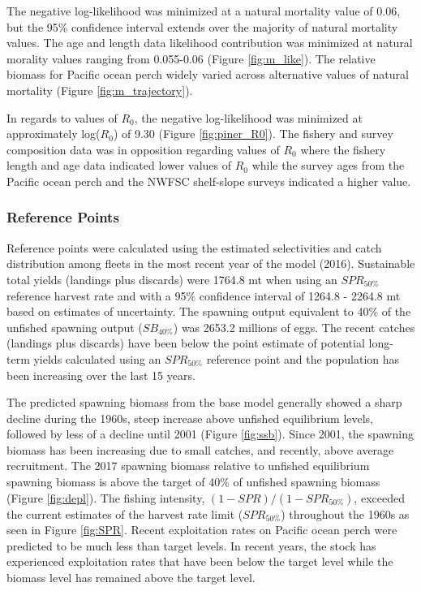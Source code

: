 \documentclass[12pt,]{article}
\begin{document}
The negative log-likelihood was minimized at a natural mortality value
of 0.06, but the 95\% confidence interval extends over the majority of
natural mortality values. The age and length data likelihood
contribution was minimized at natural morality values ranging from
0.055-0.06 (Figure \ref{fig:m_like}). The relative biomass for Pacific
ocean perch widely varied across alternative values of natural mortality
(Figure \ref{fig:m_trajectory}).

In regards to values of \(R_0\), the negative log-likelihood was
minimized at approximately log(\(R_0\)) of 9.30 (Figure
\ref{fig:piner_R0}). The fishery and survey composition data was in
opposition regarding values of \(R_0\) where the fishery length and age
data indicated lower values of \(R_0\) while the survey ages from the
Pacific ocean perch and the NWFSC shelf-slope surveys indicated a higher
value.

\subsubsection{Reference Points}\label{reference-points-1}

Reference points were calculated using the estimated selectivities and
catch distribution among fleets in the most recent year of the model
(2016). Sustainable total yields (landings plus discards) were 1764.8 mt
when using an \(SPR_{50\%}\) reference harvest rate and with a 95\%
confidence interval of 1264.8 - 2264.8 mt based on estimates of
uncertainty. The spawning output equivalent to 40\% of the unfished
spawning output (\(SB_{40\%}\)) was 2653.2 millions of eggs. The recent
catches (landings plus discards) have been below the point estimate of
potential long-term yields calculated using an \(SPR_{50\%}\) reference
point and the population has been increasing over the last 15 years.

The predicted spawning biomass from the base model generally showed a
sharp decline during the 1960s, steep increase above unfished
equilibrium levels, followed by less of a decline until 2001 (Figure
\ref{fig:ssb}). Since 2001, the spawning biomass has been increasing due
to small catches, and recently, above average recruitment. The 2017
spawning biomass relative to unfished equilibrium spawning biomass is
above the target of 40\% of unfished spawning biomass (Figure
\ref{fig:depl}). The fishing intensity, \((1-SPR)/(1-SPR_{50\%})\),
exceeded the current estimates of the harvest rate limit
(\(SPR_{50\%}\)) throughout the 1960s as seen in Figure \ref{fig:SPR}.
Recent exploitation rates on Pacific ocean perch were predicted to be
much less than target levels. In recent years, the stock has experienced
exploitation rates that have been below the target level while the
biomass level has remained above the target level.
\end{document}
